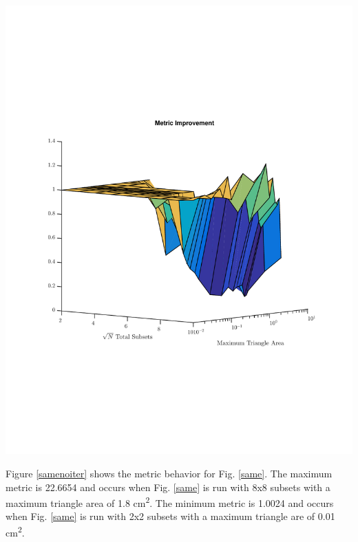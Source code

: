 \noindent\begin{minipage}{\textwidth}
\centering
\includegraphics[scale=0.78, trim = 0cm 2cm 0cm 3cm,clip]{figures/OppDiff.pdf}
\label{oppdiff}
\end{minipage}

Figure \ref{samenoiter} shows the metric behavior for Fig. \ref{same}. The maximum metric is 22.6654 and occurs when Fig. \ref{same} is run with 8x8 subsets with a maximum triangle area of 1.8 cm\textsuperscript{2}. The minimum metric is 1.0024 and occurs when Fig. \ref{same} is run with 2x2 subsets with a maximum triangle are of 0.01 cm\textsuperscript{2}.

